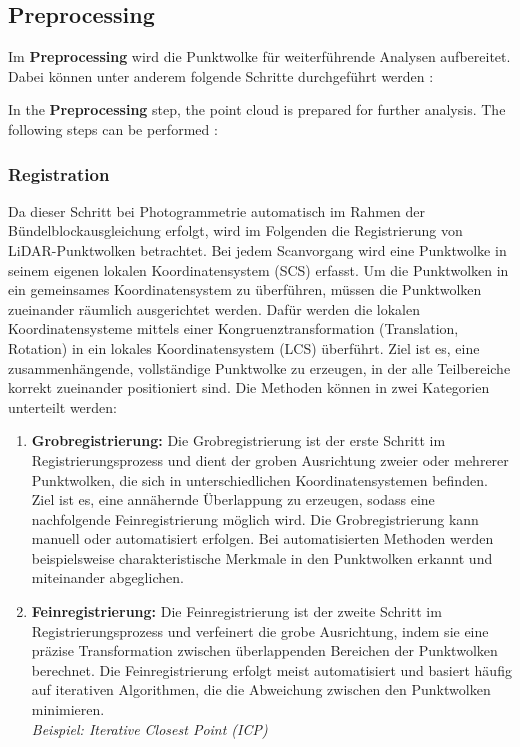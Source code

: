 \subsection{Preprocessing}
\begin{German}
    Im \textbf{Preprocessing} wird die Punktwolke für weiterführende Analysen aufbereitet. Dabei können unter anderem folgende Schritte durchgeführt werden \cite{rashdiScanningTechnologiesBuilding2022,liu3DPointCloud2021}:
\end{German}

\begin{English}
    In the \textbf{Preprocessing} step, the point cloud is prepared for further analysis. The following steps can be performed \cite{rashdiScanningTechnologiesBuilding2022,liu3DPointCloud2021}:
\end{English}

\subsubsection{Registration}
\begin{German}
    Da dieser Schritt bei Photogrammetrie automatisch im Rahmen der Bündelblockausgleichung erfolgt, wird im Folgenden die Registrierung von LiDAR-Punktwolken betrachtet. Bei jedem Scanvorgang wird eine Punktwolke in seinem eigenen lokalen Koordinatensystem (SCS) erfasst. Um die Punktwolken in ein gemeinsames Koordinatensystem zu überführen, müssen die Punktwolken zueinander räumlich ausgerichtet werden. Dafür werden die lokalen Koordinatensysteme mittels einer Kongruenztransformation (Translation, Rotation) in ein lokales Koordinatensystem (LCS) überführt. Ziel ist es, eine zusammenhängende, vollständige Punktwolke zu erzeugen, in der alle Teilbereiche korrekt zueinander positioniert sind. Die Methoden können in zwei Kategorien unterteilt werden:

    \begin{enumerate}
        \item \textbf{Grobregistrierung:} Die Grobregistrierung ist der erste Schritt im Registrierungsprozess und dient der groben Ausrichtung zweier oder mehrerer Punktwolken, die sich in unterschiedlichen Koordinatensystemen befinden. Ziel ist es, eine annähernde Überlappung zu erzeugen, sodass eine nachfolgende Feinregistrierung möglich wird. Die Grobregistrierung kann manuell oder automatisiert erfolgen. Bei automatisierten Methoden werden beispielsweise charakteristische Merkmale in den Punktwolken erkannt und miteinander abgeglichen.
        \item \textbf{Feinregistrierung:} Die Feinregistrierung ist der zweite Schritt im Registrierungsprozess und verfeinert die grobe Ausrichtung, indem sie eine präzise Transformation zwischen überlappenden Bereichen der Punktwolken berechnet. Die Feinregistrierung erfolgt meist automatisiert und basiert häufig auf iterativen Algorithmen, die die Abweichung zwischen den Punktwolken minimieren.\\
        \textit{Beispiel: Iterative Closest Point (ICP)}
    \end{enumerate}
\end{German}

